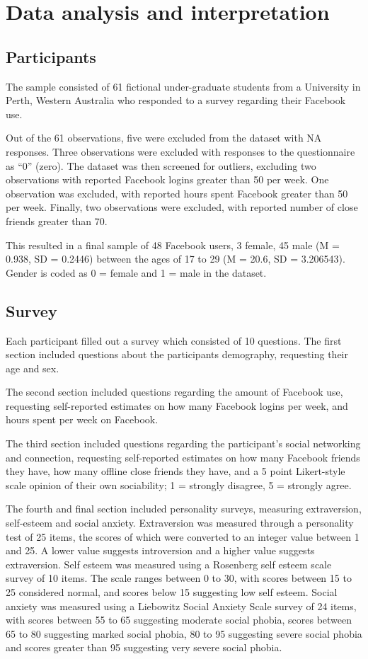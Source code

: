 \section{Data analysis and interpretation}

\subsection{Participants}

The sample consisted of 61 fictional under-graduate students from a University in Perth, Western Australia who responded to a survey regarding their Facebook use. 

Out of the 61 observations, five were excluded from the dataset with NA responses. Three observations were excluded with responses to the questionnaire as ``0'' (zero). The dataset was then screened for outliers, excluding two observations with reported Facebook logins greater than 50 per week. One observation was excluded, with reported hours spent Facebook greater than 50 per week. Finally, two observations were excluded, with reported number of close friends greater than 70.

This resulted in a final sample of 48 Facebook users, 3 female, 45 male (M = 0.938, SD = 0.2446) between the ages of 17 to 29 (M = 20.6, SD = 3.206543). Gender is coded as 0 = female and 1 = male in the dataset.

\subsection{Survey}

Each participant filled out a survey which consisted of 10 questions. The first section included questions about the participants demography, requesting their age and sex. 

The second section included questions regarding the amount of Facebook use, requesting self-reported estimates on how many Facebook logins per week, and hours spent per week on Facebook. 

The third section included questions regarding the participant's social networking and connection, requesting self-reported estimates on how many Facebook friends they have, how many offline close friends they have, and a 5 point Likert-style scale opinion of their own sociability; 1 = strongly disagree, 5 = strongly agree. 

The fourth and final section included personality surveys, measuring extraversion, self-esteem and social anxiety. Extraversion was measured through a personality test of 25 items, the scores of which were converted to an integer value between 1 and 25. A lower value suggests introversion and a higher value suggests extraversion. Self esteem was measured using a Rosenberg self esteem scale survey of 10 items. The scale ranges between 0 to 30, with scores between 15 to 25 considered normal, and scores below 15 suggesting low self esteem. Social anxiety was measured using a Liebowitz Social Anxiety Scale survey of 24 items, with scores between 55 to 65 suggesting moderate social phobia, scores between 65 to 80 suggesting marked social phobia, 80 to 95 suggesting severe social phobia and scores greater than 95 suggesting very severe social phobia.

